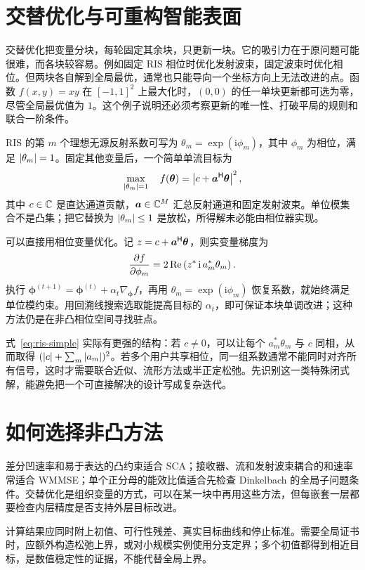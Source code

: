 \section{交替优化与可重构智能表面}
\label{sec:ris}

交替优化把变量分块，每轮固定其余块，只更新一块。它的吸引力在于原问题可能很难，而各块较容易。例如固定 RIS 相位时优化发射波束，固定波束时优化相位。但两块各自解到全局最优，通常也只能导向一个坐标方向上无法改进的点。函数 $f(x,y)=xy$ 在 $[-1,1]^2$ 上最大化时，$(0,0)$ 的任一单块更新都可选为零，尽管全局最优值为 $1$。这个例子说明还必须考察更新的唯一性、打破平局的规则和联合一阶条件。

RIS 的第 $m$ 个理想无源反射系数可写为 $\theta_m=\exp(\mathrm i\phi_m)$，其中 $\phi_m$ 为相位，满足 $\left\lvert \theta_m\right\rvert=1$。固定其他变量后，一个简单单流目标为
\begin{equation}
 \max_{\left\lvert \theta_m\right\rvert=1}\quad
 f(\bm\theta)=\left\lvert c+\bm a^{\mathsf H}\bm\theta\right\rvert^2,
 \label{eq:ris-simple}
\end{equation}
其中 $c\in\mathbb C$ 是直达通道贡献，$\bm a\in\mathbb C^M$ 汇总反射通道和固定发射波束。单位模集合不是凸集；把它替换为 $\left\lvert \theta_m\right\rvert\leq1$ 是放松，所得解未必能由相位器实现。

可以直接用相位变量优化。记 $z=c+\bm a^{\mathsf H}\bm\theta$，则实变量梯度为
\begin{equation}
 \frac{\partial f}{\partial\phi_m}
 =2\operatorname{Re}\left(z^*\,\mathrm i\,a_m^*\theta_m\right).
\end{equation}
执行 $\bm\phi^{(t+1)}=\bm\phi^{(t)}+\alpha_t\nabla_{\bm\phi}f$，再用 $\theta_m=\exp(\mathrm i\phi_m)$ 恢复系数，就始终满足单位模约束。用回溯线搜索选取能提高目标的 $\alpha_t$，即可保证本块单调改进；这种方法仍是在非凸相位空间寻找驻点。

式~\eqref{eq:ris-simple} 实际有更强的结构：若 $c\ne0$，可以让每个 $a_m^*\theta_m$ 与 $c$ 同相，从而取得 $(\left\lvert c\right\rvert+\sum_m\left\lvert a_m\right\rvert)^2$。若多个用户共享相位，同一组系数通常不能同时对齐所有信号，这时才需要联合近似、流形方法或半正定松弛。先识别这一类特殊闭式解，能避免把一个可直接解决的设计写成复杂迭代。

\section{如何选择非凸方法}

差分凹速率和易于表达的凸约束适合 SCA；接收器、流和发射波束耦合的和速率常适合 WMMSE；单个正分母的能效比值适合先检查 Dinkelbach 的全局子问题条件。交替优化是组织变量的方式，可以在某一块中再用这些方法，但每嵌套一层都要检查内层精度是否支持外层目标改进。

计算结果应同时附上初值、可行性残差、真实目标曲线和停止标准。需要全局证书时，应额外构造松弛上界，或对小规模实例使用分支定界；多个初值都得到相近目标，是数值稳定性的证据，不能代替全局上界。
